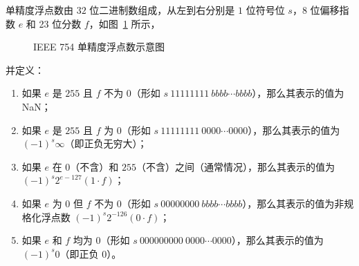             单精度浮点数由 $32$ 位二进制数组成，从左到右分别是 $1$ 位符号位 $s$，$8$ 位偏移指数 $e$ 和 23 位分数 $f$，如图~\ref{fig:NumberSystemBasics/FloatingPointNotations/IEEE754/BasicFormats/Single} 所示，
            \begin{figure}
                \centering
                \caption{IEEE 754 单精度浮点数示意图}
                \label{fig:NumberSystemBasics/FloatingPointNotations/IEEE754/BasicFormats/Single}
            \end{figure}

            并定义：
            \begin{enumerate}
                \item 如果 $e$ 是 $255$ 且 $f$ 不为 $0$（形如 $s\ 11111111\ bbbb \cdots bbbb$），那么其表示的值为 NaN；
                \item 如果 $e$ 是 $255$ 且 $f$ 为 $0$（形如 $s\ 11111111\ 0000 \cdots 0000$），那么其表示的值为 $(-1)^s\infty$（即正负无穷大）；
                \item 如果 $e$ 在 $0$（不含）和 $255$（不含）之间（通常情况），那么其表示的值为 $(-1)^s2^{e-127}(1 \cdot f)$；
                \item 如果 $e$ 为 $0$ 但 $f$ 不为 $0$（形如 $s\ 00000000\ bbbb \cdots bbbb$），那么其表示的值为非规格化浮点数 $(-1)^s2^{-126}(0 \cdot f)$；
                \item 如果 $e$ 和 $f$ 均为 $0$（形如 $s\ 000000000\ 0000 \cdots 0000$），那么其表示的值为 $(-1)^s0$（即正负 $0$）。
            \end{enumerate}

